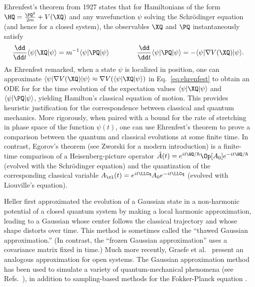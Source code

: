 \documentclass{article}
\numberwithin{equation}{section}
\begin{document}
Ehrenfest's theorem \cite{ehrenfest1927bemerkung} from 1927 states that for Hamiltonians of the form 
$\HQ = \frac{\PQ^2}{2m} + V(\XQ)$ and any wavefunction $\psi$
solving the Schr\"{o}dinger equation (and hence for a closed system), the observables $\XQ$ 
and $\PQ$ instantaneously satisfy
\begin{equation}
\begin{split} \label{eq:ehrenfest}
     \frac{\dd}{\dd t}\langle \psi| \XQ |\psi\rangle
    = m^{-1}\langle \psi| \PQ|\psi\rangle  \qquad\qquad
    \frac{\dd}{\dd t}\langle \psi| \PQ |\psi\rangle
    = -\langle \psi| \nabla V(\XQ)|\psi\rangle.
\end{split}
\end{equation}
As Ehrenfest remarked, when a state $\psi$ is localized 
in position,
one can approximate $\langle \psi| \nabla V(\XQ)|\psi\rangle \approx \nabla V(\langle \psi |\XQ|\psi\rangle)$ in Eq.~\eqref{eq:ehrenfest} to obtain an ODE for for the time evolution of the expectation values $\langle \psi |\XQ|\psi\rangle$ and $\langle \psi |\PQ|\psi\rangle$, yielding Hamilton's classical equation of motion. This provides heuristic justification for the correspondence between classical and quantum mechanics.  
More rigorously, when paired with a bound for the rate of stretching in phase space of the function $\psi(t)$, one can use Ehrenfest's theorem to prove a comparison between the quantum and classical evolutions at some finite time.  
In contrast, Egorov's theorem \cite{egorov1969canonical} (see Zworski \cite{zworski2022semiclassical} for a modern introduction) 
is a finite-time comparison of 
a Heisenberg-picture operator
$\hat{A}(t) =  e^{it\HQ/\hbar} \Op[A_0] e^{-it\HQ/\hbar}$ (evolved with the Schr\"{o}dinger equation) and the quantization of the corresponding classical variable $A_\cl(t) = e^{it\LLCq} A_0 e^{-it\LLCq}$ (evolved with Liouville's equation).  


Heller \cite{heller1975time} first approximated the evolution of a Gaussian state in a non-harmonic potential of a closed quantum system by making a local harmonic approximation, leading to a Gaussian whose center follows the classical trajectory and whose shape distorts over time.  This method is sometimes called the ``thawed Gaussian approximation.'' (In contrast, the ``frozen Gaussian approximation'' \cite{heller1981frozen} uses a covariance matrix fixed in time.) Much more recently, Graefe et al.~\cite{graefe2018lindblad} present an analogous approximation for open systems.  The Gaussian approximation method has been used to simulate a variety of quantum-mechanical phenomena (see Refs.~\cite{davis1979semiclassical,lee1982exact,drolshagen1983time}), in addition to sampling-based methods for the Fokker-Planck equation \cite{scharpenberg2012adaptive}.  
\end{document}
